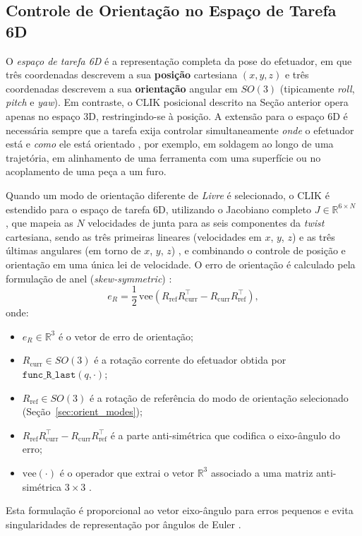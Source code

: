 \subsection{Controle de Orientação no Espaço de Tarefa 6D}
\label{sec:clik_6d}

O \emph{espaço de tarefa 6D} é a representação completa da pose do efetuador, em que três coordenadas descrevem a sua \textbf{posição} cartesiana $(x, y, z)$ e três coordenadas descrevem a sua \textbf{orientação} angular em $SO(3)$ (tipicamente \textit{roll}, \textit{pitch} e \textit{yaw}). Em contraste, o CLIK posicional descrito na Seção anterior opera apenas no espaço 3D, restringindo-se à posição. A extensão para o espaço 6D é necessária sempre que a tarefa exija controlar simultaneamente \emph{onde} o efetuador está e \emph{como} ele está orientado , por exemplo, em soldagem ao longo de uma trajetória, em alinhamento de uma ferramenta com uma superfície ou no acoplamento de uma peça a um furo.

Quando um modo de orientação diferente de \textit{Livre} é selecionado, o CLIK é estendido para o espaço de tarefa 6D, utilizando o Jacobiano completo $J \in \mathbb{R}^{6 \times N}$ , que mapeia as $N$ velocidades de junta para as seis componentes da \textit{twist} cartesiana, sendo as três primeiras lineares (velocidades em $x$, $y$, $z$) e as três últimas angulares (em torno de $x$, $y$, $z$) , e combinando o controle de posição e orientação em uma única lei de velocidade. O erro de orientação é calculado pela formulação de anel (\textit{skew-symmetric}) \cite{chiaverini1997singularity}:
\begin{equation}
    e_R = \frac{1}{2}\,\text{vee}\!\left(R_{\text{ref}} R_{\text{curr}}^\top - R_{\text{curr}} R_{\text{ref}}^\top\right),
    \label{eq:orient_error_impl}
\end{equation}
onde:
\begin{itemize}
    \item $e_R \in \mathbb{R}^3$ é o vetor de erro de orientação;
    \item $R_{\text{curr}} \in SO(3)$ é a rotação corrente do efetuador obtida por $\texttt{func\_R\_last}(q, \cdot)$;
    \item $R_{\text{ref}} \in SO(3)$ é a rotação de referência do modo de orientação selecionado (Seção~\ref{sec:orient_modes});
    \item $R_{\text{ref}} R_{\text{curr}}^\top - R_{\text{curr}} R_{\text{ref}}^\top$ é a parte anti-simétrica que codifica o eixo-ângulo do erro;
    \item $\text{vee}(\cdot)$ é o operador que extrai o vetor $\mathbb{R}^3$ associado a uma matriz anti-simétrica $3 \times 3$ \cite{chiaverini1997singularity}.
\end{itemize}
Esta formulação é proporcional ao vetor eixo-ângulo para erros pequenos e evita singularidades de representação por ângulos de Euler \cite{siciliano2009robotics}.

